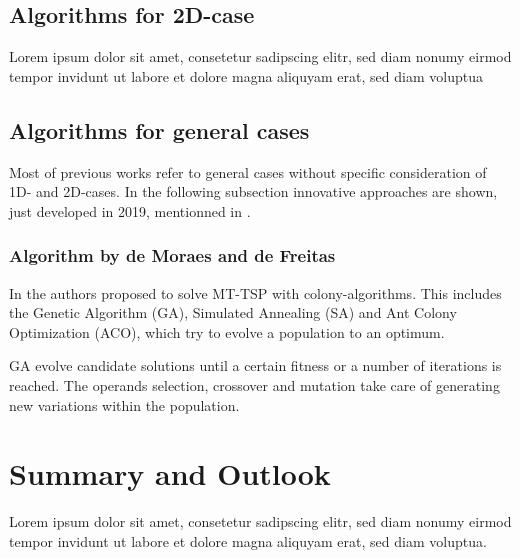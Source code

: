\documentclass{acm_proc_article-sp}
\begin{document}
\subsection{Algorithms for 2D-case}
Lorem ipsum dolor sit amet, consetetur sadipscing elitr, sed diam nonumy eirmod tempor invidunt ut labore et dolore magna aliquyam erat, sed diam voluptua

\subsection{Algorithms for general cases}
Most of previous works refer to general cases without specific consideration of 1D- and 2D-cases. In the following subsection innovative approaches are shown, just developed in 2019, mentionned in \cite{moraes}.

\subsubsection{Algorithm by de Moraes and de Freitas}
In \cite{moraes} the authors proposed to solve MT-TSP with colony-algorithms. This includes the Genetic Algorithm (GA), Simulated Annealing (SA) and Ant Colony Optimization (ACO), which try to evolve a population to an optimum.

GA evolve candidate solutions until a certain fitness or a number of iterations is reached. The operands selection, crossover and mutation take care of generating new variations within the population. 

\section{Summary and Outlook}
Lorem ipsum dolor sit amet, consetetur sadipscing elitr, sed diam nonumy eirmod tempor invidunt ut labore et dolore magna aliquyam erat, sed diam voluptua.

{}

\end{document}
